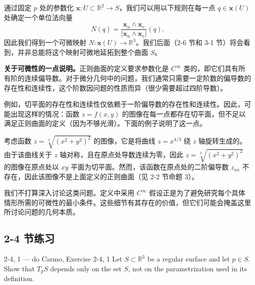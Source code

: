 通过固定 $p$ 处的参数化 $\mathbf{x}: U \subset \mathbb{R}^2 \to S$，我们可以用以下规则在每一点 $q \in \mathbf{x}(U)$ 处确定一个单位法向量
\[
N(q) = \frac{\mathbf{x}_u \wedge \mathbf{x}_v}{|\mathbf{x}_u \wedge \mathbf{x}_v|}(q).
\]
因此我们得到一个可微映射 $N: \mathbf{x}(U) \to \mathbb{R}^3$。我们后面（2-6 节和 3-1 节）将会看到，并非总能将这个映射可微地延拓到整个曲面 $S$。

\textbf{关于可微性的一点说明。}正则曲面的定义要求参数化是 $C^\infty$ 类的，即它们具有所有阶的连续偏导数。对于微分几何中的问题，我们通常只需要一定阶数的偏导数的存在性和连续性，这个阶数因问题的性质而异（很少需要超过四阶导数）。

例如，切平面的存在性和连续性仅依赖于一阶偏导数的存在性和连续性。因此，可能出现这样的情况：函数 $z = f(x,y)$ 的图像在每一点都存在切平面，但不足以满足正则曲面的定义（因为不够光滑）。下面的例子说明了这一点。

\begin{Example}[存在切平面但非正则曲面的例子]\label{ex:tangent-plane-but-not-regular}
考虑函数 $z = \sqrt[3]{(x^2 + y^2)^2}$ 的图像，它是将曲线 $z = x^{4/3}$ 绕 $z$ 轴旋转生成的。由于该曲线关于 $z$ 轴对称，且在原点处导数连续为零，因此 $z = \sqrt[3]{(x^2 + y^2)^2}$ 的图像在原点处以 $xy$ 平面为切平面。然而，该函数在原点处的二阶偏导数 $z_{xx}$ 不存在，因此该图像不是上面定义的正则曲面（见 2-2 节命题 3）。
\end{Example}

我们不打算深入讨论这类问题。定义中采用 $C^\infty$ 假设正是为了避免研究每个具体情形所需的可微性的最小条件。这些细节有其存在的价值，但它们可能会掩盖这里所讨论问题的几何本质。

\subsection*{2-4 节练习}

\begin{exercise}{2-4, 1 — do Carmo, Exercise 2-4, 1}
Let $S \subset \mathbb{R}^3$ be a regular surface and let $p \in S$. Show that $T_pS$ depends only on the set $S$, not on the parametrization used in its definition.
\end{exercise}

